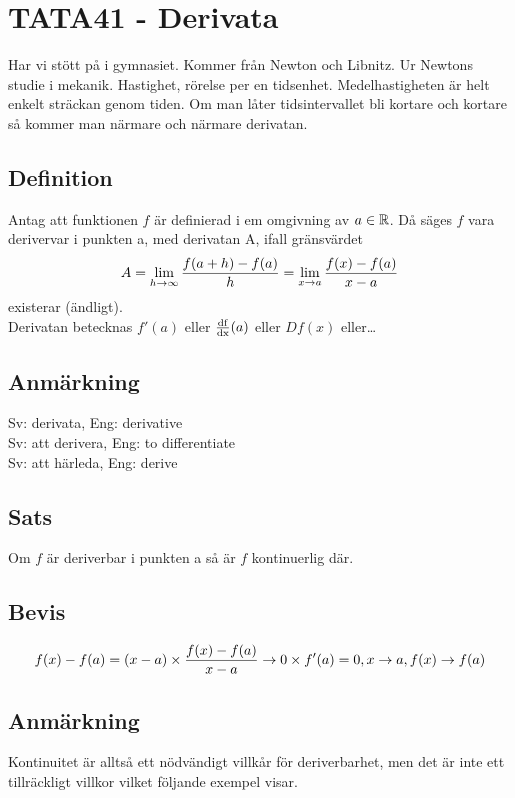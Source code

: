 \documentclass{article}
\begin{document}
\section{TATA41 - Derivata}
Har vi stött på i gymnasiet. Kommer från Newton och Libnitz. Ur Newtons studie i mekanik.
Hastighet, rörelse per en tidsenhet. Medelhastigheten är helt enkelt sträckan genom tiden.
Om man låter tidsintervallet bli kortare och kortare så kommer man närmare och närmare derivatan.

\subsection{Definition}
Antag att funktionen $f$ är definierad i em omgivning av $a\in{\mathbb R}$. Då säges $f$ vara derivervar i punkten a,
med derivatan A, ifall gränsvärdet
$$ A = \displaystyle \lim_{h \rightarrow \infty} \frac{f(a+h)-f(a)}{h} = \displaystyle \lim_{x \rightarrow a} \frac{f(x)-f(a)}{x-a} $$
existerar (ändligt).\\
Derivatan betecknas $f'(a)$ eller $\operatorname{\frac{df}{dx}}(a)$ eller $Df(x)$ eller\ldots

\subsection{Anmärkning}
Sv: derivata,
Eng: derivative\\
Sv: att derivera,
Eng: to differentiate\\
Sv: att härleda,
Eng: derive

\subsection{Sats}
Om $f$ är deriverbar i punkten a så är $f$ kontinuerlig där.

\subsection{Bevis}
$$ f(x)-f(a) = (x-a) \times \frac{f(x)-f(a)}{x-a} \to 0 \times f'(a) = 0, x \to a, f(x)\to f(a) $$

\subsection{Anmärkning}
Kontinuitet är alltså ett nödvändigt villkår för deriverbarhet, men det är inte ett tillräckligt villkor
vilket följande exempel visar.
\end{document}
